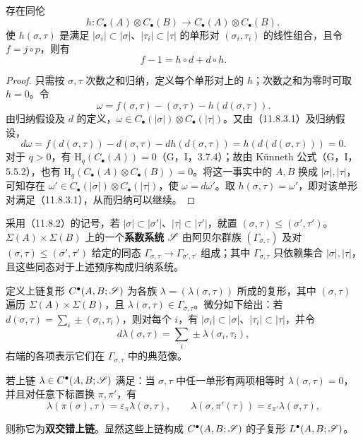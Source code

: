 存在同伦
\[
h:C_\bullet(A)\otimes C_\bullet(B)\longrightarrow C_\bullet(A)\otimes C_\bullet(B),
\]
使 $h(\sigma,\tau)$ 是满足 $|\sigma_i|\subset|\sigma|$、$|\tau_i|\subset|\tau|$ 的单形对 $(\sigma_i,\tau_i)$ 的线性组合，且令 $f=j\circ p$，则有
\begin{equation}\tag{11.8.3.1}
f-1=h\circ d+d\circ h.
\end{equation}
\begin{proof}
只需按 $\sigma,\tau$ 次数之和归纳，定义每个单形对上的 $h$；次数之和为零时可取 $h=0$。令
\[
\omega=f(\sigma,\tau)-(\sigma,\tau)-h(d(\sigma,\tau)).
\]
由归纳假设及 $d$ 的定义，$\omega\in C_\bullet(|\sigma|)\otimes C_\bullet(|\tau|)$。又由（11.8.3.1）及归纳假设，
\[
d\omega=f(d(\sigma,\tau))-d(\sigma,\tau)-dh(d(\sigma,\tau))
=h(d(d(\sigma,\tau)))=0.
\]
对于 $q>0$，有 $\mathrm H_q(C_\bullet(A))=0$（G，I，3.7.4）；故由 Künneth 公式（G，I，5.5.2），也有 $\mathrm H_q(C_\bullet(A)\otimes C_\bullet(B))=0$。将这一事实中的 $A,B$ 换成 $|\sigma|,|\tau|$，可知存在 $\omega'\in C_\bullet(|\sigma|)\otimes C_\bullet(|\tau|)$，使 $\omega=d\omega'$。取 $h(\sigma,\tau)=\omega'$，即对该单形对满足（11.8.3.1），从而归纳可以继续。
\end{proof}

采用（11.8.2）的记号，若 $|\sigma|\subset|\sigma'|$、$|\tau|\subset|\tau'|$，就置 $(\sigma,\tau)\leq(\sigma',\tau')$。$\Sigma(A)\times\Sigma(B)$ 上的一个\textbf{系数系统} $\mathscr S$ 由阿贝尔群族 $(\Gamma_{\sigma,\tau})$ 及对 $(\sigma,\tau)\leq(\sigma',\tau')$ 给定的同态 $\Gamma_{\sigma,\tau}\to\Gamma_{\sigma',\tau'}$ 组成；其中 $\Gamma_{\sigma,\tau}$ 只依赖集合 $|\sigma|,|\tau|$，且这些同态对于上述预序构成归纳系统。

定义上链复形 $C^\bullet(A,B;\mathscr S)$ 为各族 $\lambda=(\lambda(\sigma,\tau))$ 所成的复形，其中 $(\sigma,\tau)$ 遍历 $\Sigma(A)\times\Sigma(B)$，且 $\lambda(\sigma,\tau)\in\Gamma_{\sigma,\tau}$。微分如下给出：若 $d(\sigma,\tau)=\sum_i\pm(\sigma_i,\tau_i)$，则对每个 $i$，有 $|\sigma_i|\subset|\sigma|$、$|\tau_i|\subset|\tau|$，并令
\[
d\lambda(\sigma,\tau)=\sum_i\pm\lambda(\sigma_i,\tau_i),
\]
右端的各项表示它们在 $\Gamma_{\sigma,\tau}$ 中的典范像。

若上链 $\lambda\in C^\bullet(A,B;\mathscr S)$ 满足：当 $\sigma,\tau$ 中任一单形有两项相等时 $\lambda(\sigma,\tau)=0$，并且对任意下标置换 $\pi,\pi'$，有
\[
\lambda(\pi(\sigma),\tau)=\varepsilon_\pi\lambda(\sigma,\tau),\qquad
\lambda(\sigma,\pi'(\tau))=\varepsilon_{\pi'}\lambda(\sigma,\tau),
\]
\begin{sloppypar}
则称它为\textbf{双交错上链}。显然这些上链构成 $C^\bullet(A,B;\mathscr S)$ 的子复形 $L^\bullet(A,B;\mathscr S)$。
\end{sloppypar}


